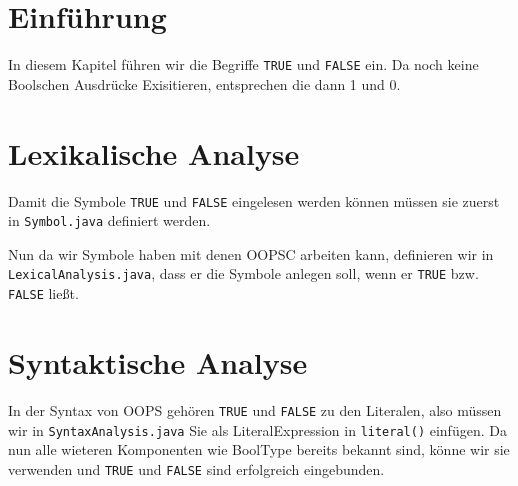 \section{Einführung}
In diesem Kapitel führen wir die Begriffe \verb|TRUE| und \verb|FALSE| ein.
Da noch keine Boolschen Ausdrücke Exisitieren, entsprechen die dann 1 und 0.\\

\section{Lexikalische Analyse}
Damit die Symbole  \verb|TRUE| und \verb|FALSE|  eingelesen werden können müssen sie zuerst in  \verb|Symbol.java| definiert werden.

Nun da wir Symbole haben mit denen OOPSC arbeiten kann, definieren wir in \verb|LexicalAnalysis.java|, dass er die Symbole anlegen soll, wenn er \verb|TRUE| bzw. \verb|FALSE| ließt.


\section{Syntaktische Analyse}
In der Syntax von OOPS gehören  \verb|TRUE| und \verb|FALSE| zu den Literalen, also müssen wir in \verb|SyntaxAnalysis.java| Sie als LiteralExpression in \verb|literal()| einfügen. Da nun alle wieteren Komponenten wie BoolType bereits bekannt sind, könne wir sie verwenden und  \verb|TRUE| und \verb|FALSE| sind erfolgreich eingebunden.

